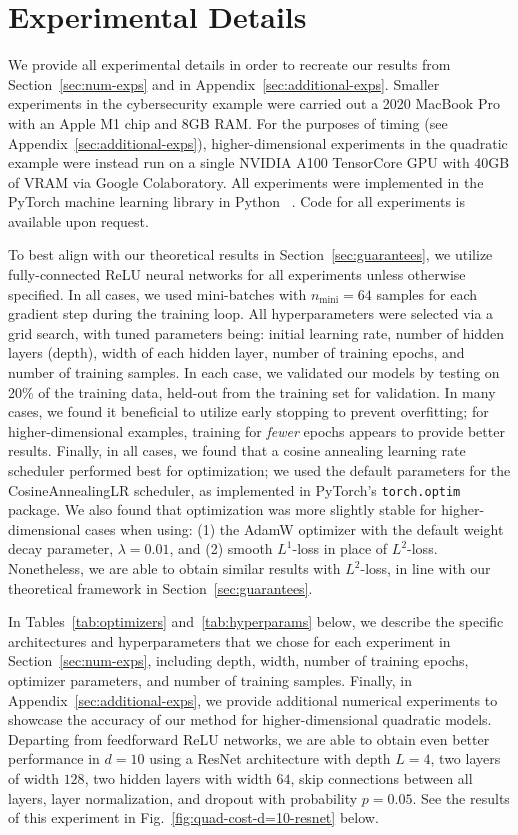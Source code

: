 \documentclass[11pt,reqno]{amsart}
\numberwithin{equation}{section}
\theoremstyle{plain}
\newcommand{\1}{\boldsymbol{\mathbbm{1}}}
\begin{document}
\normalfont
\appendix

\section{Experimental Details}
\label{sec:exp-details}
We provide all experimental details in order to recreate our results from Section~\ref{sec:num-exps} and in Appendix~\ref{sec:additional-exps}. Smaller experiments in the cybersecurity example were carried out a 2020 MacBook Pro with an Apple M1 chip and 8GB RAM. For the purposes of timing (see Appendix~\ref{sec:additional-exps}), higher-dimensional experiments in the quadratic example were instead run on a single NVIDIA A100 TensorCore GPU with 40GB of VRAM via Google Colaboratory. All experiments were implemented in the PyTorch machine learning library in Python ~\citep{pytorch}. Code for all experiments is available upon request.

To best align with our theoretical results in Section~\ref{sec:guarantees}, we utilize fully-connected ReLU neural networks for all experiments unless otherwise specified. In all cases, we used mini-batches with $n_{\mathrm{mini}} = 64$ samples for each gradient step during the training loop. All hyperparameters were selected via a grid search, with tuned parameters being: initial learning rate, number of hidden layers (depth), width of each hidden layer, number of training epochs, and number of training samples. In each case, we validated our models by testing on 20\% of the training data, held-out from the training set for validation. In many cases, we found it beneficial to utilize early stopping to prevent overfitting; for higher-dimensional examples, training for \textit{fewer} epochs appears to provide better results. Finally, in all cases, we found that a cosine annealing learning rate scheduler performed best for optimization; we used the default parameters for the CosineAnnealingLR scheduler, as implemented in PyTorch's \texttt{torch.optim} package. We also found that optimization was more slightly stable for higher-dimensional cases when using: (1) the AdamW optimizer with the default weight decay parameter, $\lambda = 0.01$, and (2) smooth $L^1$-loss in place of $L^2$-loss. Nonetheless, we are able to obtain similar results with $L^2$-loss, in line with our theoretical framework in Section~\ref{sec:guarantees}.

In Tables~\ref{tab:optimizers} and~\ref{tab:hyperparams} below, we describe the specific architectures and hyperparameters that we chose for each experiment in Section~\ref{sec:num-exps}, including depth, width, number of training epochs, optimizer parameters, and number of training samples. Finally, in Appendix~\ref{sec:additional-exps}, we provide additional numerical experiments to showcase the accuracy of our method for higher-dimensional quadratic models. Departing from feedforward ReLU networks, we are able to obtain even better performance in $d = 10$ using a ResNet architecture with depth $L = 4$, two layers of width $128$, two hidden layers with width $64$, skip connections between all layers, layer normalization, and dropout with probability $p = 0.05$. See the results of this experiment in Fig.~\ref{fig:quad-cost-d=10-resnet} below.
\end{document}
